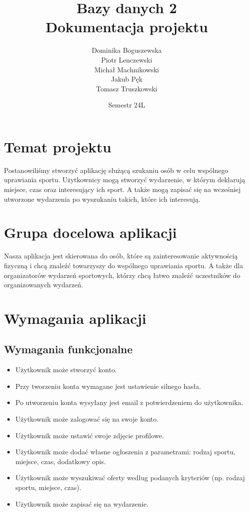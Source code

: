 \documentclass[11pt,a4paper]{article}
\title{Bazy danych 2 \\
Dokumentacja projektu}
\author{Dominika Boguszewska \\
Piotr Lenczewski \\
Michał Machnikowski \\
Jakub Pęk \\
Tomasz Truszkowski}
\date{Semestr 24L}
\begin{document}
\maketitle

\tableofcontents

\newpage

\section{Temat projektu}

Postanowiliśmy stworzyć aplikację służącą szukaniu osób w celu wspólnego uprawiania sportu. Użytkownicy mogą stworzyć wydarzenie, w którym deklarują miejsce, czas oraz interesujący ich sport. A także mogą zapisać się na wcześniej utworzone wydarzenia po wyszukaniu takich, które ich interesują.

\section{Grupa docelowa aplikacji}

Nasza aplikacja jest skierowana do osób, które są zainteresowanie aktywnością fizyczną i chcą znaleźć towarzyszy do wspólnego uprawiania sportu. A także dla organizatorów wydarzeń sportowych, którzy chcą łatwo znaleźć uczestników do organizowanych wydarzeń.

\section{Wymagania aplikacji}

\subsection{Wymagania funkcjonalne}

\begin{itemize}
    \item Użytkownik może stworzyć konto.
    \item Przy tworzeniu konta wymagane jest ustawienie silnego hasła.
    \item Po utworzeniu konta wysyłany jest email z potwierdzeniem do użytkownika.
    \item Użytkownik może zalogować się na swoje konto.
    \item Użytkownik może ustawić swoje zdjęcie profilowe.
    \item Użytkownik może dodać własne ogłoszenia z parametrami: rodzaj sportu, miejsce, czas, dodatkowy opis.
    \item Użytkownik może wyszukiwać oferty według podanych kryteriów (np. rodzaj sportu, miejsce, czas).
    \item Użytkownik może zapisać się na wydarzenie.
\end{itemize}
 
\end{document}
